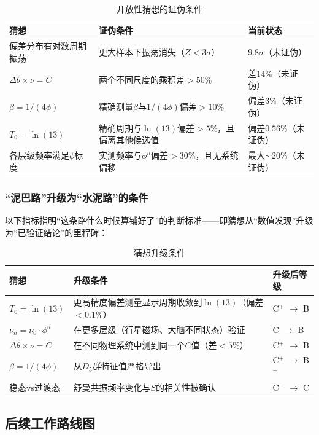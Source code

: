 \begin{table}[htbp]
\centering
\caption{开放性猜想的证伪条件}
\label{tab:falsifiability}
\begin{tabular}{lll}
\hline
猜想 & 证伪条件 & 当前状态 \\
\hline
偏差分布有对数周期振荡 & 更大样本下振荡消失（$Z<3\sigma$） & $9.8\sigma$（未证伪） \\
$\Delta\theta \times \nu = C$ & 两个不同尺度的乘积差$>50\%$ & 差$14\%$（未证伪） \\
$\beta = 1/(4\phi)$ & 精确测量$\beta$与$1/(4\phi)$偏差$>10\%$ & 偏差$3\%$（未证伪） \\
$T_0 = \ln(13)$ & 精确周期与$\ln(13)$偏差$>5\%$，且偏离其他候选值 & 偏差$0.56\%$（未证伪） \\
各层级频率满足$\phi$标度 & 实测频率与$\phi^n$偏差$>30\%$，且无系统偏移 & 最大$\sim 20\%$（未证伪） \\
\hline
\end{tabular}
\end{table}

\subsubsection{``泥巴路''升级为``水泥路''的条件}
\label{subsubsec:upgrade_conditions}

以下指标指明``这条路什么时候算铺好了''的判断标准——即猜想从``数值发现''升级为``已验证结论''的里程碑：

\begin{table}[htbp]
\centering
\caption{猜想升级条件}
\label{tab:upgrade_conditions}
\begin{tabular}{lll}
\hline
猜想 & 升级条件 & 升级后等级 \\
\hline
$T_0 = \ln(13)$ & 更高精度偏差测量显示周期收敛到$\ln(13)$（偏差$<0.1\%$） & C$^+$ $\to$ B \\
$\nu_n = \nu_0 \cdot \phi^n$ & 在更多层级（行星磁场、大脑不同状态）验证 & C $\to$ B \\
$\Delta\theta \times \nu = C$ & 在不同物理系统中测到同一个$C$值（差$<5\%$） & C$^+$ $\to$ B \\
$\beta = 1/(4\phi)$ & 从$D_5$群特征值严格导出 & C$^+$ $\to$ B$^+$ \\
稳态vs过渡态 & 舒曼共振频率变化与$S$的相关性被确认 & C$^-$ $\to$ C \\
\hline
\end{tabular}
\end{table}

\subsection{后续工作路线图}
\label{subsec:roadmap}

